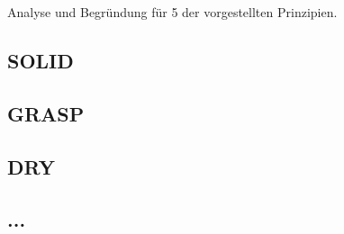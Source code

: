 Analyse und Begründung für 5 der vorgestellten Prinzipien.


\subsection*{SOLID}




\subsection*{GRASP}



\subsection*{DRY}



\subsection*{...}